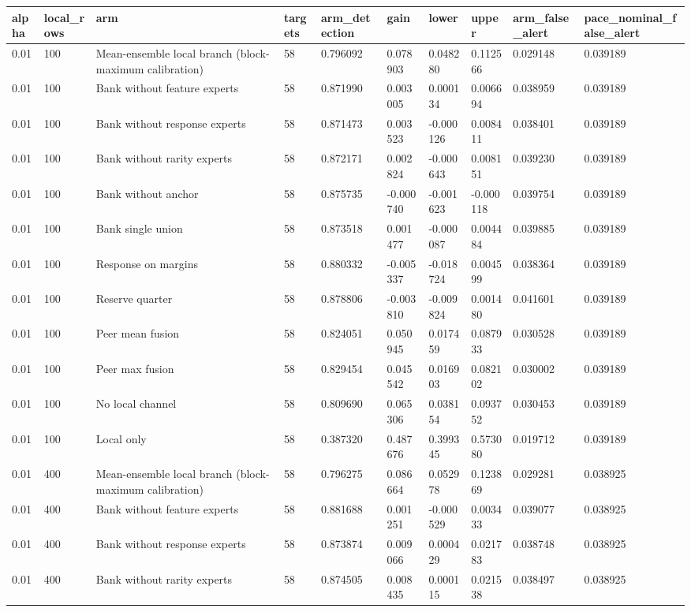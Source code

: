 \begin{tabular}{llllllllll}
\toprule
alpha & local\_rows & arm & targets & arm\_detection & gain & lower & upper & arm\_false\_alert & pace\_nominal\_false\_alert \\
\midrule
0.01 & 100 & Mean-ensemble local branch (block-maximum calibration) & 58 & 0.796092 & 0.078903 & 0.048280 & 0.112566 & 0.029148 & 0.039189 \\
0.01 & 100 & Bank without feature experts & 58 & 0.871990 & 0.003005 & 0.000134 & 0.006694 & 0.038959 & 0.039189 \\
0.01 & 100 & Bank without response experts & 58 & 0.871473 & 0.003523 & -0.000126 & 0.008411 & 0.038401 & 0.039189 \\
0.01 & 100 & Bank without rarity experts & 58 & 0.872171 & 0.002824 & -0.000643 & 0.008151 & 0.039230 & 0.039189 \\
0.01 & 100 & Bank without anchor & 58 & 0.875735 & -0.000740 & -0.001623 & -0.000118 & 0.039754 & 0.039189 \\
0.01 & 100 & Bank single union & 58 & 0.873518 & 0.001477 & -0.000087 & 0.004484 & 0.039885 & 0.039189 \\
0.01 & 100 & Response on margins & 58 & 0.880332 & -0.005337 & -0.018724 & 0.004599 & 0.038364 & 0.039189 \\
0.01 & 100 & Reserve quarter & 58 & 0.878806 & -0.003810 & -0.009824 & 0.001480 & 0.041601 & 0.039189 \\
0.01 & 100 & Peer mean fusion & 58 & 0.824051 & 0.050945 & 0.017459 & 0.087933 & 0.030528 & 0.039189 \\
0.01 & 100 & Peer max fusion & 58 & 0.829454 & 0.045542 & 0.016903 & 0.082102 & 0.030002 & 0.039189 \\
0.01 & 100 & No local channel & 58 & 0.809690 & 0.065306 & 0.038154 & 0.093752 & 0.030453 & 0.039189 \\
0.01 & 100 & Local only & 58 & 0.387320 & 0.487676 & 0.399345 & 0.573080 & 0.019712 & 0.039189 \\
0.01 & 400 & Mean-ensemble local branch (block-maximum calibration) & 58 & 0.796275 & 0.086664 & 0.052978 & 0.123869 & 0.029281 & 0.038925 \\
0.01 & 400 & Bank without feature experts & 58 & 0.881688 & 0.001251 & -0.000529 & 0.003433 & 0.039077 & 0.038925 \\
0.01 & 400 & Bank without response experts & 58 & 0.873874 & 0.009066 & 0.000429 & 0.021783 & 0.038748 & 0.038925 \\
0.01 & 400 & Bank without rarity experts & 58 & 0.874505 & 0.008435 & 0.000115 & 0.021538 & 0.038497 & 0.038925 \\

\end{tabular}
